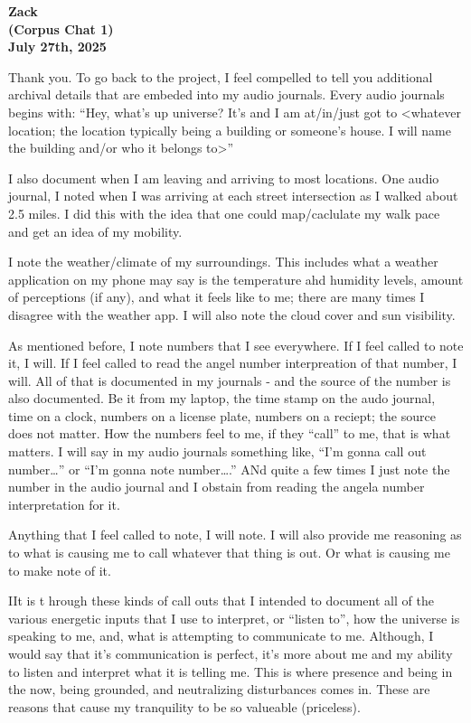 \documentclass{article}
\begin{document}
\begin{center}
\textbf{Zack} \\
\textbf{(Corpus Chat 1)} \\
\textbf{July 27th, 2025}
\end{center}

\medskip

Thank you. To go back to the project, I feel compelled to tell you
additional archival details that are embeded into my audio journals.
Every audio journals begins with: ``Hey, what's up universe? It's and I
am at/in/just got to \textless whatever location; the location typically
being a building or someone's house. I will name the building and/or who
it belongs to\textgreater{}''

I also document when I am leaving and arriving to most locations. One
audio journal, I noted when I was arriving at each street intersection
as I walked about 2.5 miles. I did this with the idea that one could
map/caclulate my walk pace and get an idea of my mobility.

I note the weather/climate of my surroundings. This includes what a
weather application on my phone may say is the temperature ahd humidity
levels, amount of perceptions (if any), and what it feels like to me;
there are many times I disagree with the weather app. I will also note
the cloud cover and sun visibility.

As mentioned before, I note numbers that I see everywhere. If I feel
called to note it, I will. If I feel called to read the angel number
interpreation of that number, I will. All of that is documented in my
journals - and the source of the number is also documented. Be it from
my laptop, the time stamp on the audo journal, time on a clock, numbers
on a license plate, numbers on a reciept; the source does not matter.
How the numbers feel to me, if they ``call'' to me, that is what
matters. I will say in my audio journals something like, ``I'm gonna
call out number\ldots{}'' or ``I'm gonna note number\ldots.'' ANd quite
a few times I just note the number in the audio journal and I obstain
from reading the angela number interpretation for it.

Anything that I feel called to note, I will note. I will also provide me
reasoning as to what is causing me to call whatever that thing is out.
Or what is causing me to make note of it.

IIt is t hrough these kinds of call outs that I intended to document all
of the various energetic inputs that I use to interpret, or ``listen
to'', how the universe is speaking to me, and, what is attempting to
communicate to me. Although, I would say that it's communication is
perfect, it's more about me and my ability to listen and interpret what
it is telling me. This is where presence and being in the now, being
grounded, and neutralizing disturbances comes in. These are reasons that
cause my tranquility to be so valueable (priceless).
\end{document}
